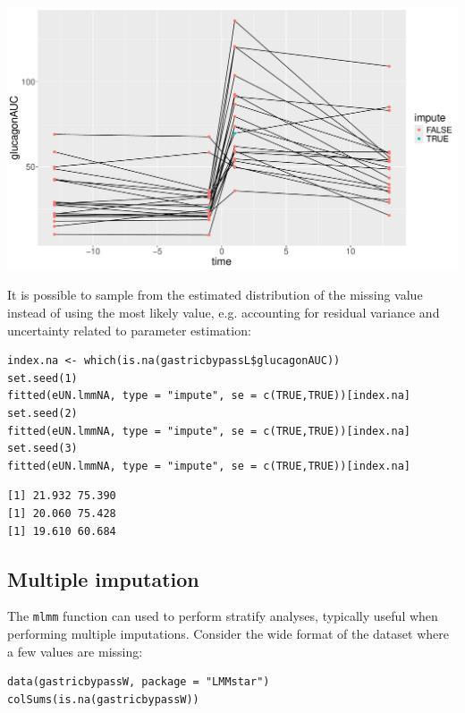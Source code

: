 \documentclass[12pt]{article}
\begin{document}
\begin{center}
\includegraphics[trim={0 0 0 0},width=1\textwidth]{./figures/imputation.pdf}
\end{center}

It is possible to sample from the estimated distribution of the
missing value instead of using the most likely value, e.g. accounting
for residual variance and uncertainty related to parameter estimation:
\lstset{language=r,label= ,caption= ,captionpos=b,numbers=none}
\begin{lstlisting}
index.na <- which(is.na(gastricbypassL$glucagonAUC))
set.seed(1)
fitted(eUN.lmmNA, type = "impute", se = c(TRUE,TRUE))[index.na]
set.seed(2)
fitted(eUN.lmmNA, type = "impute", se = c(TRUE,TRUE))[index.na]
set.seed(3)
fitted(eUN.lmmNA, type = "impute", se = c(TRUE,TRUE))[index.na]
\end{lstlisting}

\begin{verbatim}
[1] 21.932 75.390
[1] 20.060 75.428
[1] 19.610 60.684
\end{verbatim}


\clearpage

\subsection{Multiple imputation}
\label{sec:org4c359e2}

The \texttt{mlmm} function can used to perform stratify analyses, typically
useful when performing multiple imputations. Consider the wide format
of the dataset where a few values are missing:
\lstset{language=r,label= ,caption= ,captionpos=b,numbers=none}
\begin{lstlisting}
data(gastricbypassW, package = "LMMstar")
colSums(is.na(gastricbypassW))
\end{lstlisting}
\end{document}
